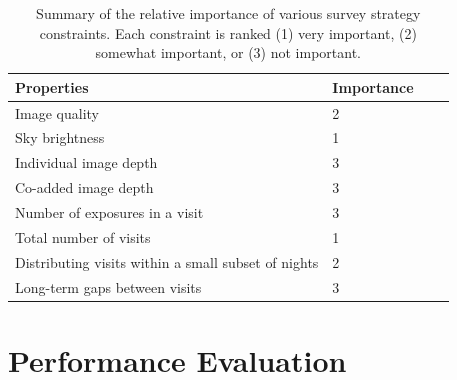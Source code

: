 \documentclass[12pt, letterpaper]{article}
\begin{document}
\begin{table}[ht]
    \centering
    \begin{tabular}{|l|l|l|l|}
        \hline
        Properties & Importance \hspace{.3in} \\
        \hline
        Image quality & 2\\
        Sky brightness & 1\\
        Individual image depth & 3\\
        Co-added image depth & 3\\
        Number of exposures in a visit & 3\\
        Total number of visits & 1\\
        Distributing visits within a small subset of nights & 2\\
        Long-term gaps between visits & 3\\
        \hline
    \end{tabular}
    \caption{Summary of the relative importance of various survey strategy constraints. Each constraint is ranked (1) very important, (2) somewhat important, or (3) not important.}
        \label{tab:obs_constraints}
\end{table}

\section{Performance Evaluation}
\end{document}
